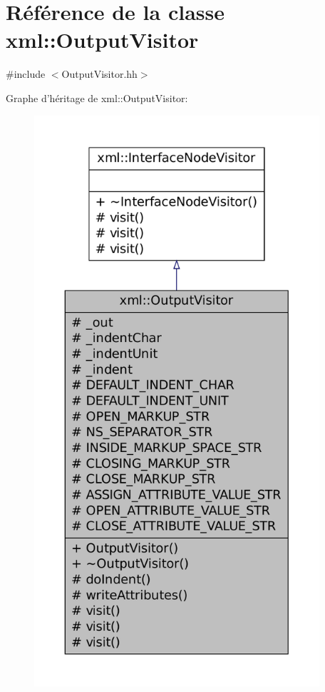 \hypertarget{classxml_1_1_output_visitor}{
\section{Référence de la classe xml::OutputVisitor}
\label{classxml_1_1_output_visitor}
}


{\ttfamily \#include $<$OutputVisitor.hh$>$}



Graphe d'héritage de xml::OutputVisitor:
\nopagebreak
\begin{figure}[H]
\begin{center}
\leavevmode
\includegraphics[height=600pt]{classxml_1_1_output_visitor__inherit__graph}
\end{center}
\end{figure}


